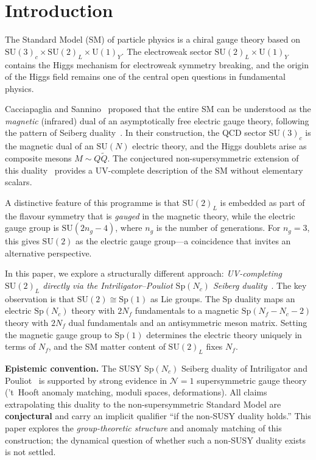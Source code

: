 \documentclass[11pt,a4paper]{article}
\theoremstyle{plain}
\theoremstyle{definition}
\theoremstyle{remark}
\newcommand{\Nc}{N_{\!c}}
\newcommand{\Nf}{N_{\!f}}
\newcommand{\SU}[1]{\mathrm{SU}(#1)}
\newcommand{\UU}[1]{\mathrm{U}(#1)}
\newcommand{\Sp}[1]{\mathrm{Sp}(#1)}
\begin{document}
\section{Introduction}
\label{sec:introduction}

The Standard Model (SM) of particle physics is a
chiral gauge theory based on
$\SU{3}_c \times \SU{2}_L \times \UU{1}_Y$.  The electroweak sector
$\SU{2}_L \times \UU{1}_Y$ contains the Higgs mechanism for
electroweak symmetry breaking, and the origin of the Higgs field
remains one of the central open questions in fundamental physics.

Cacciapaglia and Sannino~\cite{CacciapagliaSannino2024} proposed that
the entire SM can be understood as the \emph{magnetic} (infrared)
dual of an asymptotically free electric gauge theory, following the
pattern of Seiberg duality~\cite{Seiberg1995}.  In their construction,
the QCD sector $\SU{3}_c$ is the magnetic dual of an $\SU{N}$
electric theory, and the Higgs doublets arise as composite mesons
$M \sim Q\widetilde{Q}$.  The conjectured non-supersymmetric
extension of this duality~\cite{AMPS2011,Sannino2011} provides a
UV-complete description of the SM without elementary scalars.

A distinctive feature of this programme is that $\SU{2}_L$ is
embedded as part of the flavour symmetry that is \emph{gauged} in
the magnetic theory, while the electric gauge group is
$\SU{2n_g - 4}$, where $n_g$ is the number of generations.  For
$n_g = 3$, this gives $\SU{2}$ as the electric gauge group---a
coincidence that invites an alternative perspective.

In this paper, we explore a structurally different approach:
\emph{UV-completing $\SU{2}_L$ directly via the Intriligator--Pouliot
$\Sp{\Nc}$ Seiberg duality}~\cite{IP9505006,IS1995}.
The key observation is that $\SU{2} \cong \Sp{1}$ as Lie groups.
The Sp duality maps an electric $\Sp{\Nc}$ theory with $2\Nf$
fundamentals to a magnetic $\Sp{\Nf - \Nc - 2}$ theory with
$2\Nf$ dual fundamentals and an antisymmetric meson matrix.  Setting
the magnetic gauge group to $\Sp{1}$ determines the electric theory
uniquely in terms of $\Nf$, and the SM matter content of $\SU{2}_L$
fixes $\Nf$.

\medskip

\textbf{Epistemic convention.}  The SUSY $\Sp{\Nc}$ Seiberg duality
of Intriligator and Pouliot~\cite{IP9505006} is supported by strong
evidence in $\mathcal{N}=1$ supersymmetric gauge theory ('t~Hooft
anomaly matching, moduli spaces, deformations).  All claims
extrapolating this duality to the non-supersymmetric Standard Model
are \textbf{conjectural} and carry an implicit qualifier ``if the
non-SUSY duality holds.''  This paper explores the
\emph{group-theoretic structure} and anomaly matching of this
construction; the dynamical question of whether such a non-SUSY
duality exists is not settled.
\end{document}
